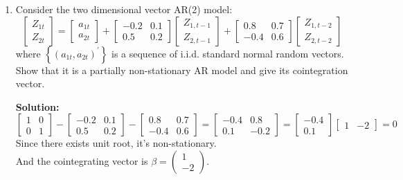 \documentclass{article}
\begin{document}
\begin{enumerate}
	\item Consider the two dimensional vector AR(2) model:
	\begin{equation*}
	\left[ \begin{array}{c}{Z_{1 t}} \\ {Z_{2 t}}\end{array}\right]=\left[ \begin{array}{c}{a_{1 t}} \\ {a_{2 t}}\end{array}\right]+\left[ \begin{array}{cc}{-0.2} & {0.1} \\ {0.5} & {0.2}\end{array}\right] \left[ \begin{array}{c}{Z_{1, t-1}} \\ {Z_{2, t-1}}\end{array}\right]+\left[ \begin{array}{cc}{0.8} & {0.7} \\ {-0.4} & {0.6}\end{array}\right] \left[ \begin{array}{c}{Z_{1, t-2}} \\ {Z_{2, t-2}}\end{array}\right]
	\end{equation*}
	where $\left\{\left(a_{1 t}, a_{2 t}\right)^{\prime}\right\}$ is a sequence of i.i.d. standard normal random vectors.
	Show that it is a partially non-stationary AR model and give its cointegration vector.
	
	\textbf{Solution:}
	\begin{equation*}
	\left[ \begin{array}{ll}{1} & {0} \\ {0} & {1}\end{array}\right]-\left[ \begin{array}{cc}{-0.2} & {0.1} \\ {0.5} & {0.2}\end{array}\right]-\left[ \begin{array}{cc}{0.8} & {0.7} \\ {-0.4} & {0.6}\end{array}\right]=\left[ \begin{array}{cc}{-0.4} & {0.8} \\ {0.1} & {-0.2}\end{array}\right]=\left[ \begin{array}{c}{-0.4} \\ {0.1}\end{array}\right] \left[ \begin{array}{ll}{1} & {-2}\end{array}\right] = 0
	\end{equation*}
	Since there exists unit root, it's non-stationary.\\
	And the cointegrating vector is $\beta=\left( \begin{array}{c}{1} \\ {-2}\end{array}\right)$.
	

\end{enumerate}
\end{document}
